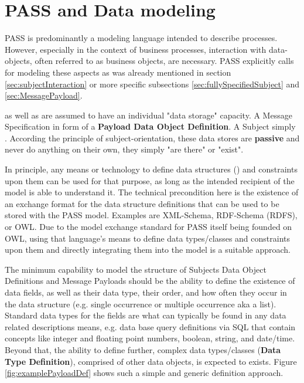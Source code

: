 \section{PASS and Data modeling}
\label{sec:PassAndData}

PASS is predominantly a modeling language intended to describe processes. However, especially in the context of business processes, interaction with data-objects, often referred to as business objects, are necessary. PASS explicitly calls for modeling these aspects as was already mentioned in section \ref{sec:subjectInteraction} or more specific subsections \ref{sec:fullySpecifiedSubject} and \ref{sec:MessagePayload}.

 as well as  are assumed to have an individual "data storage" capacity.  A Message Specification   in form of a \textbf{Payload Data Object Definition}. A Subject simply . According the principle of subject-orientation, these data stores are \textbf{passive} and never do anything on their own, they simply "are there" or "exist". 

In principle, any means or technology to define data structures () and constraints upon them can be used for that purpose, as long as the intended recipient of the model is able to understand it. The technical precondition here is the existence of an exchange format for the data structure definitions that can be used to be stored with the PASS model. Examples are XML-Schema, RDF-Schema (RDFS), or OWL. Due to the model exchange standard for PASS itself being founded on OWL, using that language's means to define data types/classes and constraints upon them and directly integrating them into the model is a suitable approach.

The minimum capability to model the structure of Subjects Data Object Definitions and Message Payloads should be the ability to define the existence of data fields, as well as their data type, their order, and how often they occur in the data structure (e.g. single occurrence or multiple occurrence aka a list). Standard data types for the fields are what can typically be found in any data related descriptions means, e.g. data base query definitions via SQL that contain concepts like  integer and floating point numbers, boolean, string, and date/time. Beyond that, the ability to define further, complex data types/classes (\textbf{Data Type Definition}), comprised of other data objects, is expected to exists. Figure \ref{fig:examplePayloadDef} shows such a simple and generic definition approach.

